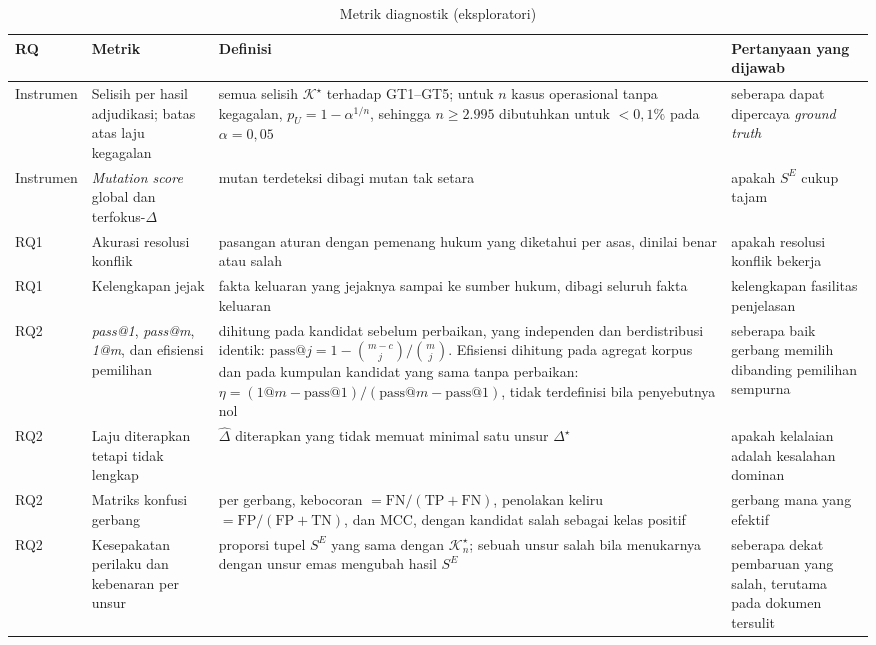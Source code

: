 \documentclass[journal,a4paper]{IEEEtran}
\newcommand{\en}[1]{\textit{#1}}
\newcommand{\K}{\mathcal{K}}
\newcommand{\emas}{\star}
\newcommand{\SE}{S^{E}}
\begin{document}
\begin{table}[t]
\centering
\caption{Metrik diagnostik (eksploratori)}
\label{tab:diagnostik}
\scriptsize
\begin{tabularx}{\textwidth}{@{}P{1.2cm} P{3.4cm} L P{3.4cm}@{}}
\toprule
\textbf{RQ} & \textbf{Metrik} & \textbf{Definisi} & \textbf{Pertanyaan yang dijawab} \\
\midrule
Instrumen & Selisih per hasil adjudikasi; batas atas laju kegagalan & semua selisih $\K^{\emas}$ terhadap GT1--GT5; untuk $n$ kasus operasional tanpa kegagalan, $p_U = 1-\alpha^{1/n}$, sehingga $n \geq 2.995$ dibutuhkan untuk $<0{,}1\%$ pada $\alpha=0{,}05$ & seberapa dapat dipercaya \en{ground truth} \\
Instrumen & \en{Mutation score} global dan terfokus-$\Delta$ & mutan terdeteksi dibagi mutan tak setara & apakah $\SE$ cukup tajam \\
RQ1 & Akurasi resolusi konflik & pasangan aturan dengan pemenang hukum yang diketahui per asas, dinilai benar atau salah & apakah resolusi konflik bekerja \\
RQ1 & Kelengkapan jejak & fakta keluaran yang jejaknya sampai ke sumber hukum, dibagi seluruh fakta keluaran & kelengkapan fasilitas penjelasan \\
\midrule
RQ2 & \en{pass@1}, \en{pass@m}, \en{1@m}, dan efisiensi pemilihan & dihitung pada kandidat sebelum perbaikan, yang independen dan berdistribusi identik: $\text{pass@}j = 1-\binom{m-c}{j}/\binom{m}{j}$. Efisiensi dihitung pada agregat korpus dan pada kumpulan kandidat yang sama tanpa perbaikan: $\eta = (\text{1@}m - \text{pass@}1)/(\text{pass@}m - \text{pass@}1)$, tidak terdefinisi bila penyebutnya nol & seberapa baik gerbang memilih dibanding pemilihan sempurna \\
RQ2 & Laju diterapkan tetapi tidak lengkap & $\hat{\Delta}$ diterapkan yang tidak memuat minimal satu unsur $\Delta^{\emas}$ & apakah kelalaian adalah kesalahan dominan \\
RQ2 & Matriks konfusi gerbang & per gerbang, kebocoran $=\mathrm{FN}/(\mathrm{TP}+\mathrm{FN})$, penolakan keliru $=\mathrm{FP}/(\mathrm{FP}+\mathrm{TN})$, dan MCC, dengan kandidat salah sebagai kelas positif & gerbang mana yang efektif \\
RQ2 & Kesepakatan perilaku dan kebenaran per unsur & proporsi tupel $\SE$ yang sama dengan $\K^{\emas}_n$; sebuah unsur salah bila menukarnya dengan unsur emas mengubah hasil $\SE$ & seberapa dekat pembaruan yang salah, terutama pada dokumen tersulit \\

\end{tabularx}
\end{table}
\end{document}
